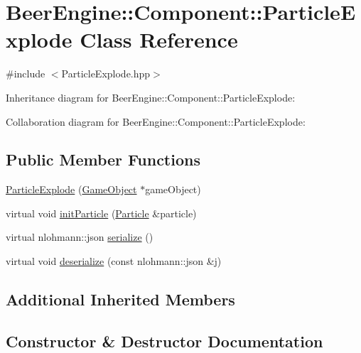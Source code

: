 \hypertarget{class_beer_engine_1_1_component_1_1_particle_explode}{}\section{Beer\+Engine\+:\+:Component\+:\+:Particle\+Explode Class Reference}
\label{class_beer_engine_1_1_component_1_1_particle_explode}


{\ttfamily \#include $<$Particle\+Explode.\+hpp$>$}



Inheritance diagram for Beer\+Engine\+:\+:Component\+:\+:Particle\+Explode\+:


Collaboration diagram for Beer\+Engine\+:\+:Component\+:\+:Particle\+Explode\+:
\subsection*{Public Member Functions}
\begin{DoxyCompactItemize}
\item 
\mbox{\hyperlink{class_beer_engine_1_1_component_1_1_particle_explode_a4e2e2cda3419ea1cab71a61c6e13abad}{Particle\+Explode}} (\mbox{\hyperlink{class_beer_engine_1_1_game_object}{Game\+Object}} $\ast$game\+Object)
\item 
virtual void \mbox{\hyperlink{class_beer_engine_1_1_component_1_1_particle_explode_abe727afab3c6a77d2b163e2c37a0f37b}{init\+Particle}} (\mbox{\hyperlink{struct_beer_engine_1_1_component_1_1_particle}{Particle}} \&particle)
\item 
virtual nlohmann\+::json \mbox{\hyperlink{class_beer_engine_1_1_component_1_1_particle_explode_a194d098568efe69f8e8b62eec5863ae6}{serialize}} ()
\item 
virtual void \mbox{\hyperlink{class_beer_engine_1_1_component_1_1_particle_explode_ad79e74129dd1cd7f20e0575a9ffdffc3}{deserialize}} (const nlohmann\+::json \&j)
\end{DoxyCompactItemize}
\subsection*{Additional Inherited Members}


\subsection{Constructor \& Destructor Documentation}
\mbox{\label{class_beer_engine_1_1_component_1_1_particle_explode_a4e2e2cda3419ea1cab71a61c6e13abad}} 
